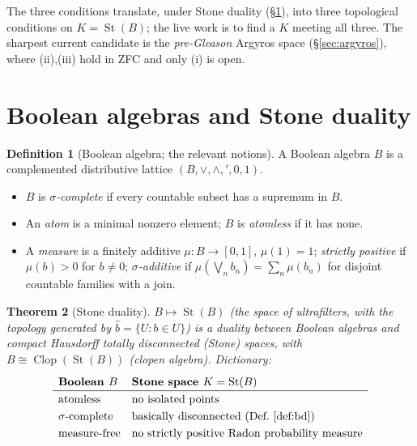 \documentclass[11pt]{article}
\newtheorem{theorem}{Theorem}[section]
\theoremstyle{definition}
\newtheorem{definition}[theorem]{Definition}
\theoremstyle{remark}
\newcommand{\Clop}{\operatorname{Clop}}
\newcommand{\St}{\operatorname{St}}
\begin{document}
The three conditions translate, under Stone duality (\S\ref{sec:stone}), into three
topological conditions on $K=\St(B)$; the live work is to find a $K$ meeting all
three. The sharpest current candidate is the \emph{pre-Gleason} Argyros space
(\S\ref{sec:argyros}), where (ii),(iii) hold in ZFC and only (i) is open.

\section{Boolean algebras and Stone duality}\label{sec:stone}

\begin{definition}[Boolean algebra; the relevant notions]\label{def:ba}
A Boolean algebra $B$ is a complemented distributive lattice $(B,\vee,\wedge,{}',0,1)$.
\begin{itemize}[nosep]
  \item $B$ is \emph{$\sigma$-complete} if every countable subset has a supremum in $B$.
  \item An \emph{atom} is a minimal nonzero element; $B$ is \emph{atomless} if it has none.
  \item A \emph{measure} is a finitely additive $\mu\colon B\to[0,1]$, $\mu(1)=1$;
    \emph{strictly positive} if $\mu(b)>0$ for $b\neq 0$; \emph{$\sigma$-additive}
    if $\mu(\bigvee_n b_n)=\sum_n\mu(b_n)$ for disjoint countable families with a join.
\end{itemize}
\end{definition}

\begin{theorem}[Stone duality]\label{thm:stone}
$B\mapsto \St(B)$ (the space of ultrafilters, with the topology generated by
$\widehat b=\{U:b\in U\}$) is a duality between Boolean algebras and compact
Hausdorff totally disconnected (\emph{Stone}) spaces, with $B\cong\Clop(\St(B))$
(clopen algebra). Dictionary:
\[
\renewcommand{\arraystretch}{1.25}
\begin{array}{ll}
\textbf{Boolean } B & \textbf{Stone space } K=\St(B)\\
\hline
\text{atomless} & \text{no isolated points}\\
\sigma\text{-complete} & \text{basically disconnected (Def.~\ref{def:bd})}\\
\text{measure-free} & \text{no strictly positive Radon probability measure}
\end{array}
\]
\end{theorem}
\end{document}
